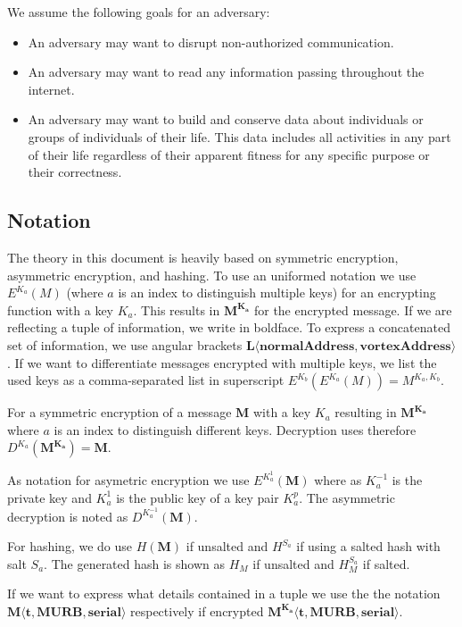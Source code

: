 \documentclass[10pt,journal,compsoc]{IEEEtran}
\begin{document}
We assume the following goals for an adversary:
\begin{itemize}
	\item An adversary may want to disrupt non-authorized communication.
	\item An adversary may want to read any information passing throughout the internet.
	\item An adversary may want to build and conserve data about individuals or groups of individuals of their life. This data includes all activities in any part of their life regardless of their apparent fitness for any specific purpose or their correctness.
\end{itemize}

\subsection{Notation \label{sec:encNot}}
The theory in this document is heavily based on symmetric encryption, asymmetric encryption, and hashing. To use an uniformed notation we use $E^{K_a}(M)$ (where $a$ is an index to distinguish multiple keys) for an encrypting function with a key $K_a$. This results in $\mathbf{M^{K_a}}$ for the encrypted message. If we are reflecting a tuple of information, we write in boldface. To express a concatenated set of information, we use angular brackets $\mathbf{L\langle normalAddress,vortexAddress\rangle }$. If we want to differentiate messages encrypted with multiple keys, we list the used keys as a comma-separated list in superscript $E^{K_b}\left(E^{K_a}\left(M\right)\right)=M^{{K_{a}},{K_b}}$.

For a symmetric encryption of a message $\mathbf{M}$ with a key $K_a$ resulting in $\mathbf{M^{K_a}}$ where $a$ is an index to distinguish different keys. Decryption uses therefore $D^{K_a}(\mathbf{M^{K_a}})=\mathbf{M}$.

As notation for asymetric encryption we use $E^{K^{1}_a}(\mathbf{M})$ where as $K^{-1}_a$ is the private key and $K^{1}_a$ is the public key of a key pair $K^p_a$. The asymmetric decryption is noted as $D^{K^{-1}_a}(\mathbf{M})$.

For hashing, we do use $H(\mathbf{M})$ if unsalted and $H^{S_a}$ if using a salted hash with salt $S_a$. The generated hash is shown as $H_M$ if unsalted and $H^{S_a}_M$ if salted.

If we want to express what details contained in a tuple we use the the notation $\mathbf{M\langle t,MURB,serial\rangle }$ respectively if encrypted $\mathbf{M^{K_{a}}\langle t,MURB,serial\rangle}$.
\end{document}
